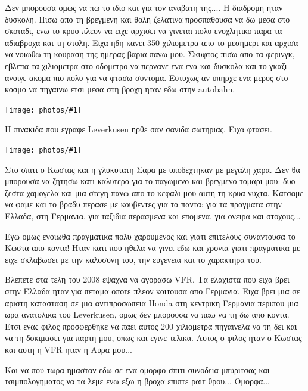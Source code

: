 \documentclass[11pt, letterpaper]{book}
\newcommand\photo[1]{\noindent\texttt{[image: photos/\#1]}}
\begin{document}
Δεν μπορουσα ομως να πω το ιδιο και για τον αναβατη της.... Η διαδρομη ηταν δυσκολη. Πισω απο τη βρεγμενη και θολη ζελατινα προσπαθουσα να δω μεσα στο σκοταδι, ενω το κρυο πλεον να ειχε αρχισει να γινεται πολυ ενοχλητικο παρα τα αδιαβροχα και τη στολη. Ειχα ηδη κανει 350 χιλιομετρα απο το μεσημερι και αρχισα να νοιωθω τη κουραση της ημερας βαρια πανω μου. 
Σκυφτος πισω απο τα φερινγκ, εβλεπα τα χιλιομετρα στο οδομετρο να περνανε ενα ενα και δυσκολα και το γκαζι ανοιγε ακομα πιο πολυ για να φτασω συντομα. Ευτυχως αν υπηρχε ενα μερος στο κοσμο να πηγαινω ετσι μεσα στη βροχη ηταν εδω στην autobahn.

\photo{123.jpg}

Η πινακιδα που εγραφε Leverkusen ηρθε σαν σανιδα σωτηριας. Ειχα φτασει. 

\photo{124.jpg}

Στο σπιτι ο Κωστας και η γλυκυτατη Σαρα με υποδεχτηκαν με μεγαλη χαρα. 
Δεν θα μπορουσα να ζητησω κατι καλυτερο για το παγωμενο και βρεγμενο τομαρι μου: δυο ζεστα χαμογελα και μια στεγη πανω απο το κεφαλι μου αυτη τη κρυα νυχτα.
Κατσαμε να φαμε και το βραδυ περασε με κουβεντες για τα παντα: για τα πραγματα στην Ελλαδα, στη Γερμανια, για ταξιδια περασμενα και επομενα, για ονειρα και στοχους... 

Εγω ομως ενοιωθα πραγματικα πολυ χαρουμενος και γιατι επιτελους συναντουσα το Κωστα απο κοντα! Ηταν κατι που ηθελα να γινει εδω και χρονια γιατι πραγματικα με ειχε σκλαβωσει με την καλοσυνη του, την ευγενεια και το χαρακτηρα του. 

Βλεπετε στα τελη του 2008 εψαχνα να αγορασω VFR. Τα ελαχιστα που ειχα βρει στην Ελλαδα ηταν για πεταμα οποτε πλεον κοιτουσα απο Γερμανια. Ειχα βρει μια σε αριστη κατασταση σε μια αντιπροσωπεια Honda στη κεντρικη Γερμανια περιπου μια ωρα ανατολικα του Leverkusen, ομως δεν μπορουσα να παω να τη δω απο κοντα. 
Ετσι ενας φιλος προσφερθηκε να παει αυτος 200 χιλιομετρα πηγαινελα να τη δει και να τη δοκιμασει για παρτη μου, οπως και εγινε τελικα. 
Αυτος ο φιλος ηταν ο Κωστας και αυτη η VFR ηταν η Αυρα μου...

Και να που τωρα ημασταν εδω σε ενα ομορφο σπιτι συνοδεια μπυριτσας και τσιμπολογηματος να τα λεμε ενω εξω η βροχα επιπτε ραιτ θρου...
Ομορφα...
\end{document}
